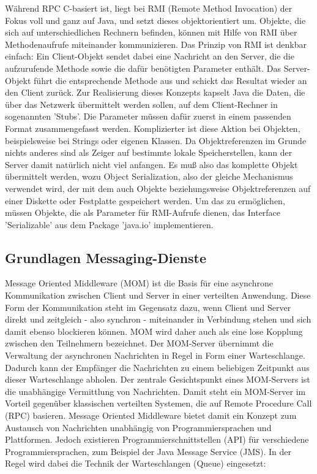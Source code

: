 \documentclass[letterpaper, 12pt]{article}
\let\tempsubsection\subsection
\renewcommand\subsection[1]{\vspace{0cm}\tempsubsection{#1}\vspace{0cm}}
\begin{document}
Während RPC C-basiert ist, liegt bei RMI (Remote Method Invocation) der Fokus voll und ganz auf Java, und setzt dieses objektorientiert um. Objekte, die sich auf unterschiedlichen Rechnern befinden, können mit Hilfe von RMI über Methodenaufrufe miteinander kommunizieren. Das Prinzip von RMI ist denkbar einfach: Ein Client-Objekt sendet dabei
eine Nachricht an den Server, die die aufzurufende Methode sowie die dafür
benötigten Parameter enthält. Das Server-Objekt führt die entsprechende
Methode aus und schickt das Resultat wieder an den Client zurück. Zur Realisierung dieses Konzepts kapselt Java die Daten, die über das Netzwerk
übermittelt werden sollen, auf dem Client-Rechner in sogenannten
'Stubs'. Die Parameter müssen dafür zuerst in einem passenden Format
zusammengefasst werden. Komplizierter ist diese Aktion bei Objekten, beispielsweise bei Strings oder
eigenen Klassen. Da Objektreferenzen im Grunde nichts anderes sind als
Zeiger auf bestimmte lokale Speicherstellen, kann der Server damit natürlich
nicht viel anfangen. Es muß also das komplette Objekt übermittelt werden,
wozu Object Serialization, also der gleiche Mechanismus verwendet
wird, der mit dem auch Objekte beziehungsweise Objektreferenzen auf
einer Diskette oder Festplatte gespeichert werden. Um das zu ermöglichen,
müssen Objekte, die als Parameter für RMI-Aufrufe dienen, das Interface
'Serializable' aus dem Package 'java.io' implementieren. \citep{rmi}

\subsection{Grundlagen Messaging-Dienste}

Message Oriented Middleware (MOM) ist die Basis für eine asynchrone Kommunikation zwischen Client und Server in einer verteilten Anwendung. Diese Form der Kommunikation steht im Gegensatz dazu, wenn Client und Server direkt und zeitgleich - also synchron - miteinander in Verbindung stehen und sich damit ebenso blockieren können. MOM wird daher auch als eine lose Kopplung zwischen den Teilnehmern bezeichnet. Der MOM-Server übernimmt die Verwaltung der asynchronen Nachrichten in Regel in Form einer Warteschlange. Dadurch kann der Empfänger die Nachrichten zu einem beliebigen Zeitpunkt aus dieser Warteschlange abholen. Der zentrale Gesichtspunkt eines MOM-Servers ist die unabhängige Vermittlung von Nachrichten. Damit steht ein MOM-Server im Vorteil gegenüber klassischen verteilten Systemen, die auf Remote Procedure Call (RPC) basieren. Message Oriented Middleware bietet damit ein Konzept zum Austausch von Nachrichten unabhängig von Programmiersprachen und Plattformen. Jedoch existieren Programmierschnittstellen (API) für verschiedene Programmiersprachen, zum Beispiel der Java Message Service (JMS). In der Regel wird dabei die Technik der Warteschlangen (Queue) eingesetzt:
\end{document}
